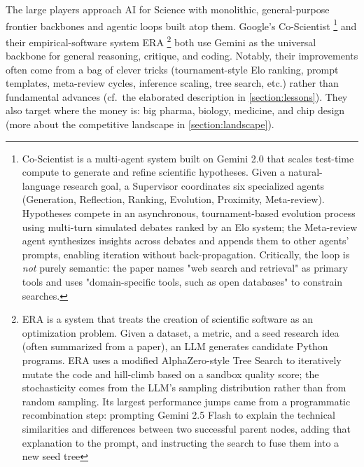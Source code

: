 The large players approach AI for Science with monolithic, general-purpose frontier backbones and agentic loops built atop them. Google's Co-Scientist \cite{Gottweis2026}\footnote{%
    Co-Scientist is a multi-agent system built on Gemini 2.0 that scales test-time compute to generate and refine scientific hypotheses. Given a natural-language research goal, a Supervisor coordinates six specialized agents (Generation, Reflection, Ranking, Evolution, Proximity, Meta-review). Hypotheses compete in an asynchronous, tournament-based evolution process using multi-turn simulated debates ranked by an Elo system; the Meta-review agent synthesizes insights across debates and appends them to other agents' prompts, enabling iteration without back-propagation. Critically, the loop is \emph{not} purely semantic: the paper names "web search and retrieval" as primary tools and uses "domain-specific tools, such as open databases" to constrain searches.
    }
and their empirical-software system ERA \cite{Aygn2026}\footnote{%
    ERA is a system that treats the creation of scientific software as an optimization problem. Given a dataset, a metric, and a seed research idea (often summarized from a paper), an LLM generates candidate Python programs. ERA uses a modified AlphaZero-style Tree Search to iteratively mutate the code and hill-climb based on a sandbox quality score; the stochasticity comes from the LLM's sampling distribution rather than from random sampling. Its largest performance jumps came from a programmatic recombination step: prompting Gemini 2.5 Flash to explain the technical similarities and differences between two successful parent nodes, adding that explanation to the prompt, and instructing the search to fuse them into a new seed tree
    }
both use Gemini as the universal backbone for general reasoning, critique, and coding. Notably, their improvements often come from a bag of clever tricks (tournament-style Elo ranking, prompt templates, meta-review cycles, inference scaling, tree search, etc.) rather than fundamental advances (cf.\ the elaborated description in \ref{section:lessons}). They also target where the money is: big pharma, biology, medicine, and chip design (more about the competitive landscape in \ref{section:landscape}).


